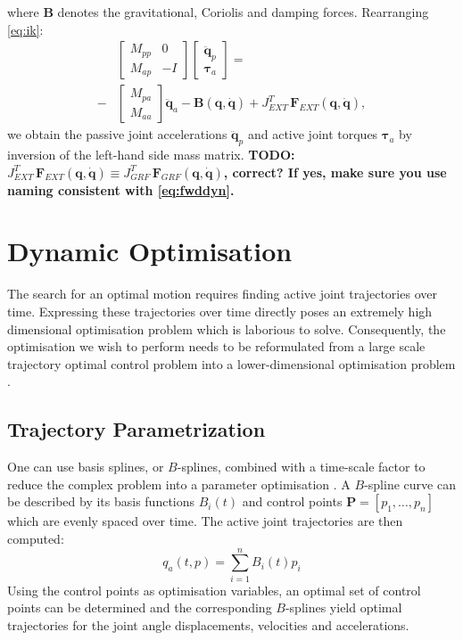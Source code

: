 \documentclass[letterpaper, 10 pt, conference]{ieeeconf}  %
\begin{document}
where $\mathbf{B}$ denotes the gravitational, Coriolis and damping forces. 
Rearranging \eqref{eq:ik}:
\begin{equation}
\begin{aligned}
&\left[\begin{array}{cc}  
M_{pp} & 0\\
M_{ap} &-I
\end{array} \right]
\left[\begin{array}{c}  
\mathbf{\ddot q}_p\\
\boldsymbol{\tau}_a
\end{array} \right] =\\ 
-&
\left[\begin{array}{c}  
M_{pa}\\
M_{aa}
\end{array} \right] 
\mathbf{\ddot q}_a-
\mathbf{B(q, \dot q)}+
J_{EXT}^T \, \mathbf{F}_{EXT}\mathbf{(q, \dot q)},
\end{aligned}
\end{equation}	
we obtain the passive joint accelerations $\mathbf{\ddot q}_p$ and active joint torques $\boldsymbol{\tau}_a$ by inversion of the left-hand side mass matrix. \textbf{TODO: $J_{EXT}^T \, \mathbf{F}_{EXT}\mathbf{(q, \dot q)} \equiv J_{GRF}^T \, \mathbf{F}_{GRF}\mathbf{(q, \dot q)}$, correct? If yes, make sure you use naming consistent with \eqref{eq:fwddyn}.}

\section{Dynamic Optimisation} \label{sec:dynamicOptimisation}

The search for an optimal motion requires finding active joint trajectories over time. Expressing these trajectories over time directly poses an extremely high dimensional optimisation problem which is laborious to solve. Consequently, the optimisation we wish to perform needs to be reformulated from a large scale trajectory optimal control problem into a lower-dimensional optimisation problem \cite{kaphle2008optimality}.


\subsection{Trajectory Parametrization}

One can use basis splines, or $B$-splines, combined with a time-scale factor to reduce the complex problem into a parameter optimisation \cite{ude2000planning,babivc2009biarticulated,wang1999weight,albro2001optimal}. A $B$-spline curve can be described by its basis functions $B_i(t)$ and control points $\mathbf{P}=\left[p_1,\dots,p_n\right]$ which are evenly spaced over time. The active joint trajectories are then computed:   
\begin{equation}
q_a(t,p) = \sum_{i=1}^{n} B_i (t) p_i
\end{equation}
Using the control points as optimisation variables, an optimal set of control points can be determined and the corresponding $B$-splines yield optimal trajectories for the joint angle displacements, velocities and accelerations. 
\end{document}
